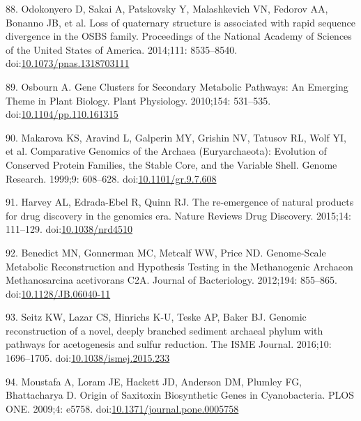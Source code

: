 \documentclass[12pt,twoside]{reedthesis}
\begin{document}
  \hypertarget{ref-odokonyeroux5flossux5f2014}{}
  88. Odokonyero D, Sakai A, Patskovsky Y, Malashkevich VN, Fedorov AA,
  Bonanno JB, et al. Loss of quaternary structure is associated with rapid
  sequence divergence in the OSBS family. Proceedings of the National
  Academy of Sciences of the United States of America. 2014;111:
  8535--8540.
  doi:\href{https://doi.org/10.1073/pnas.1318703111}{10.1073/pnas.1318703111}
  
  \hypertarget{ref-osbournux5fgeneux5f2010}{}
  89. Osbourn A. Gene Clusters for Secondary Metabolic Pathways: An
  Emerging Theme in Plant Biology. Plant Physiology. 2010;154: 531--535.
  doi:\href{https://doi.org/10.1104/pp.110.161315}{10.1104/pp.110.161315}
  
  \hypertarget{ref-makarovaux5fcomparativeux5f1999}{}
  90. Makarova KS, Aravind L, Galperin MY, Grishin NV, Tatusov RL, Wolf
  YI, et al. Comparative Genomics of the Archaea (Euryarchaeota):
  Evolution of Conserved Protein Families, the Stable Core, and the
  Variable Shell. Genome Research. 1999;9: 608--628.
  doi:\href{https://doi.org/10.1101/gr.9.7.608}{10.1101/gr.9.7.608}
  
  \hypertarget{ref-harveyux5fre-emergenceux5f2015}{}
  91. Harvey AL, Edrada-Ebel R, Quinn RJ. The re-emergence of natural
  products for drug discovery in the genomics era. Nature Reviews Drug
  Discovery. 2015;14: 111--129.
  doi:\href{https://doi.org/10.1038/nrd4510}{10.1038/nrd4510}
  
  \hypertarget{ref-benedictux5fgenome-scaleux5f2012}{}
  92. Benedict MN, Gonnerman MC, Metcalf WW, Price ND. Genome-Scale
  Metabolic Reconstruction and Hypothesis Testing in the Methanogenic
  Archaeon Methanosarcina acetivorans C2A. Journal of Bacteriology.
  2012;194: 855--865.
  doi:\href{https://doi.org/10.1128/JB.06040-11}{10.1128/JB.06040-11}
  
  \hypertarget{ref-seitzux5fgenomicux5f2016}{}
  93. Seitz KW, Lazar CS, Hinrichs K-U, Teske AP, Baker BJ. Genomic
  reconstruction of a novel, deeply branched sediment archaeal phylum with
  pathways for acetogenesis and sulfur reduction. The ISME Journal.
  2016;10: 1696--1705.
  doi:\href{https://doi.org/10.1038/ismej.2015.233}{10.1038/ismej.2015.233}
  
  \hypertarget{ref-moustafaux5foriginux5f2009}{}
  94. Moustafa A, Loram JE, Hackett JD, Anderson DM, Plumley FG,
  Bhattacharya D. Origin of Saxitoxin Biosynthetic Genes in Cyanobacteria.
  PLOS ONE. 2009;4: e5758.
  doi:\href{https://doi.org/10.1371/journal.pone.0005758}{10.1371/journal.pone.0005758}
  
\end{document}
